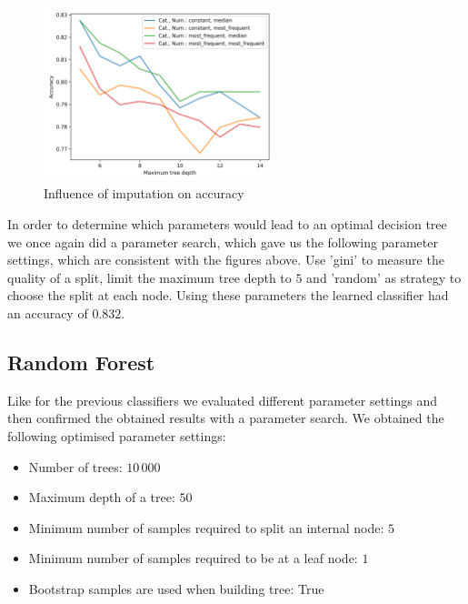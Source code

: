 \documentclass[a4paper,11pt]{article}
\begin{document}
        \begin{figure}[h!]
            \centering
            \includegraphics[width=0.6\textwidth]{exercise_1/paper/figures/credit-approval-accuracy-decision_tree.png}
            \caption{Influence of imputation on accuracy}
            \label{fig:credit-approval_decision_tree}
        \end{figure}
        
        In order to determine which parameters would lead to an optimal decision tree we once again did a parameter search, which gave us the following parameter settings, which are consistent with the figures above. Use 'gini' to measure the quality of a split, limit the maximum tree depth to $5$ and 'random' as strategy to choose the split at each node. Using these parameters the learned classifier had an accuracy of $0.832$. 
        
    \subsection{Random Forest}
        Like for the previous classifiers we evaluated different parameter settings and then confirmed the obtained results with a parameter search. We obtained the following optimised parameter settings:
        \begin{itemize}
            \item Number of trees: $10\,000$
            \item Maximum depth of a tree: $50$
            \item Minimum number of samples required to split an internal node: $5$
            \item Minimum number of samples required to be at a leaf node: $1$
            \item Bootstrap samples are used when building tree: True
        \end{itemize}
        
\end{document}

